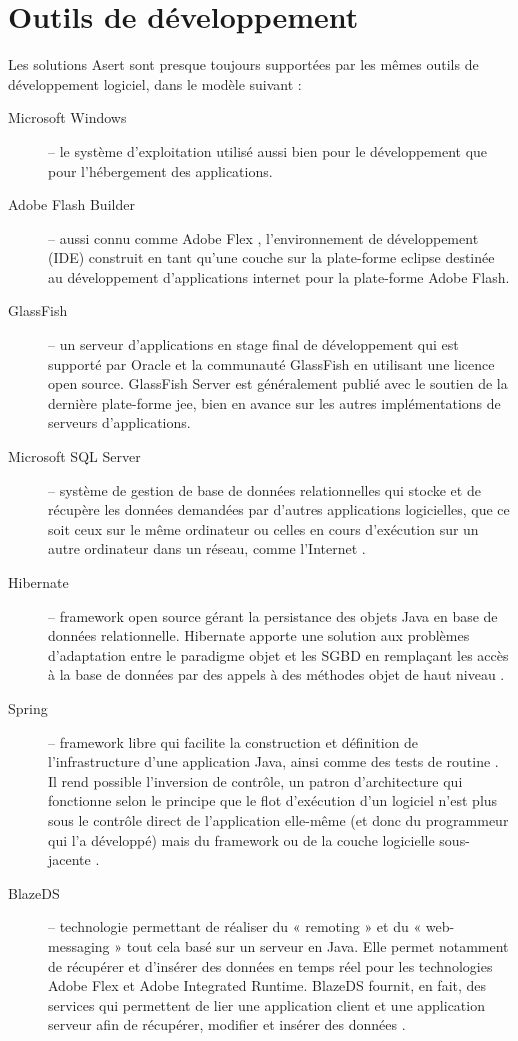 \section{Outils de développement}

Les solutions Asert sont presque toujours supportées par les mêmes outils de développement logiciel, dans le modèle suivant :
\begin{description}
\item[Microsoft Windows] -- le système d'exploitation utilisé aussi bien pour le développement que pour l'hébergement des applications.
\item[Adobe Flash Builder] -- aussi connu comme Adobe Flex \cite{flex}, l'environnement de développement (IDE) construit en tant qu'une couche sur la plate-forme \Gls{eclipse} destinée au développement d'applications internet pour la plate-forme Adobe Flash.
\item[GlassFish] -- un serveur d'applications en stage final de développement qui est supporté par Oracle et la communauté GlassFish en utilisant une licence open source. GlassFish Server \cite{glassfish} est généralement publié avec le soutien de la dernière plate-forme \gls{jee}, bien en avance sur les autres implémentations de serveurs d'applications.
\item[Microsoft SQL Server] -- système de gestion de base de données relationnelles qui stocke et de récupère les données demandées par d'autres applications logicielles, que ce soit ceux sur le même ordinateur ou celles en cours d'exécution sur un autre ordinateur dans un réseau, comme l'Internet \cite{sql-server}.
\item[Hibernate] -- framework open source gérant la persistance des objets Java en base de données relationnelle. Hibernate apporte une solution aux problèmes d'adaptation entre le paradigme objet et les \gls{SGBD} en remplaçant les accès à la base de données par des appels à des méthodes objet de haut niveau \cite{hibernate}.
\item[Spring] -- framework libre qui facilite la construction et définition de l'infrastructure d'une application Java, ainsi comme des tests de routine \cite{spring}. Il rend possible l'inversion de contrôle, un patron d'architecture qui fonctionne selon le principe que le flot d'exécution d'un logiciel n'est plus sous le contrôle direct de l'application elle-même (et donc du programmeur qui l'a développé) mais du framework ou de la couche logicielle sous-jacente \cite{wiki-ioc}.
\item[BlazeDS] -- technologie permettant de réaliser du « remoting » et du « web-messaging » tout cela basé sur un serveur en Java. Elle permet notamment de récupérer et d'insérer des données en temps réel pour les technologies Adobe Flex et Adobe Integrated Runtime. BlazeDS fournit, en fait, des services qui permettent de lier une application client et une application serveur afin de récupérer, modifier et insérer des données \cite{blazeds}.

\end{description}
